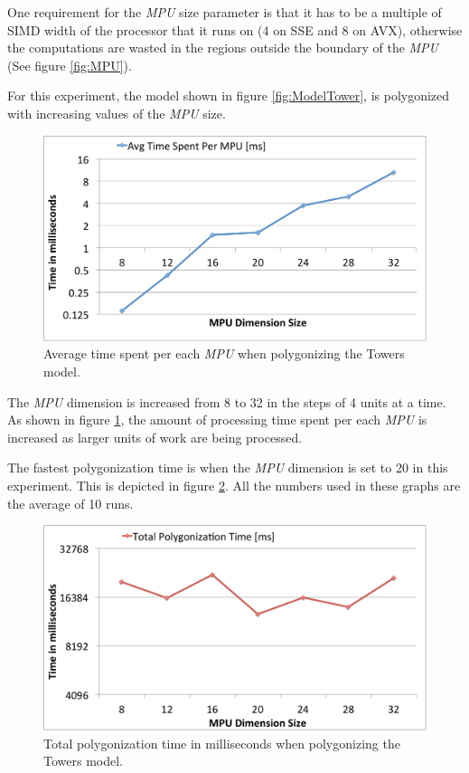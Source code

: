 One requirement for the \textit{MPU} size parameter is that it has to be a multiple of SIMD width of
the processor that it runs on (4 on SSE and 8 on AVX), otherwise the computations are wasted in the 
regions outside the boundary of the \textit{MPU} (See figure \ref{fig:MPU}).

For this experiment, the model shown in figure \ref{fig:ModelTower}, is polygonized with increasing 
values of the \textit{MPU} size. 

\begin{figure}[H]
  \centering
  \includegraphics[width = 1.0\linewidth]{figures/cpupoly/MpuSizeAnalysis/AvgTimeSpentPerMPU.pdf}
  \caption{\label{fig:AvgTimeSpentPerMPU}
  {Average time spent per each \textit{MPU} when polygonizing the Towers model.}
}
\end{figure}

The \textit{MPU} dimension is increased from 8 to 32 in the steps of 4 units at a time. As shown in
figure \ref{fig:AvgTimeSpentPerMPU}, the amount of processing time spent per each \textit{MPU} is increased 
as larger units of work are being processed. 

The fastest polygonization time is when the \textit{MPU} dimension is set to 20 in this experiment. 
This is depicted in figure \ref{fig:TotalPolyTime}. All the numbers used in these graphs are the average of 10 runs. 

\begin{figure}[H]
  \centering
  \includegraphics[width = 1.0\linewidth]{figures/cpupoly/MpuSizeAnalysis/TotalPolyTime.pdf}
  \caption{\label{fig:TotalPolyTime}
  {Total polygonization time in milliseconds when polygonizing the Towers model.}
}
\end{figure}

